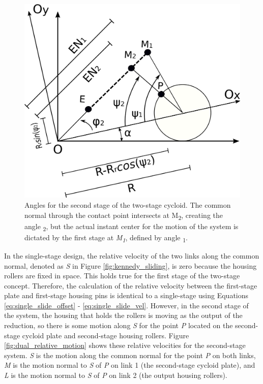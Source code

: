 \begin{figure}[t]
	\centering
	\includegraphics[width=0.50\linewidth]{fig/two_stage_angles}
   \caption{Angles for the second stage of the two-stage cycloid. The common normal through the contact point intersects at M\textsubscript{2}, creating the angle \textpsi\textsubscript{2}, but the actual instant center for the motion of the system is dictated by the first stage at \textit{M\textsubscript{1}}, defined by angle \textpsi\textsubscript{1}.}
   \label{fig:two_stage_angles}
\end{figure}


In the single-stage design, the relative velocity of the two links along the common normal, denoted as \textit{S} in Figure \ref{fig:kennedy_sliding}, is zero because the housing rollers are fixed in space. This holds true for the first stage of the two-stage concept. Therefore, the calculation of the relative velocity between the first-stage plate and first-stage housing pins is identical to a single-stage using Equations \ref{eq:single_slide_offset} - \ref{eq:single_slide_vel}. However, in the second stage of the system, the housing that holds the rollers is moving as the output of the reduction, so there is some motion along \textit{S} for the point \textit{P} located on the second-stage cycloid plate and second-stage housing rollers. Figure \ref{fig:dual_relative_motion} shows these relative velocities for the second-stage system. \textit{S} is the motion along the common normal for the point \textit{P} on both links, \textit{M} is the motion normal to \textit{S} of \textit{P} on link 1 (the second-stage cycloid plate), and \textit{L} is the motion normal to \textit{S} of \textit{P} on link 2 (the output housing rollers). 


